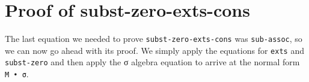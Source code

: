 \hypertarget{proof-of-subst-zero-exts-cons}{%
\section{Proof of
subst-zero-exts-cons}\label{proof-of-subst-zero-exts-cons}}

The last equation we needed to prove \texttt{subst-zero-exts-cons} was
\texttt{sub-assoc}, so we can now go ahead with its proof. We simply
apply the equations for \texttt{exts} and \texttt{subst-zero} and then
apply the σ algebra equation to arrive at the normal form
\texttt{M\ •\ σ}.

\begin{fence}
\begin{code}%
\>[0]%
\>[2388I]\AgdaSymbol{:}\AgdaSpace{}%
\AgdaSpace{}%
\AgdaSymbol{\}\{}\AgdaSpace{}%
\AgdaSymbol{:}\AgdaSpace{}%
\AgdaSpace{}%
\AgdaSpace{}%
\AgdaSymbol{\}\{}\AgdaSymbol{\}\{}\AgdaSpace{}%
\AgdaSymbol{:}\AgdaSpace{}%
\AgdaSpace{}%
\AgdaSpace{}%
\AgdaSymbol{\}\{}\AgdaSymbol{\}}\<%
\\
\>[.][@{}l@{}]\<[2388I]%
\>[21]\AgdaSpace{}%
\AgdaSpace{}%
\AgdaSpace{}%
\AgdaSpace{}%
\AgdaSpace{}%
\AgdaSpace{}%
\AgdaSpace{}%
\AgdaSymbol{(}\AgdaSpace{}%
\AgdaSpace{}%
\AgdaSymbol{)}\AgdaSpace{}%
\AgdaSymbol{\{}\AgdaSymbol{\}}\<%
\\
\>[0]\AgdaSpace{}%
\AgdaSymbol{\{}\AgdaSymbol{\}\{}\AgdaSymbol{\}\{}\AgdaSymbol{\}\{}\AgdaSymbol{\}\{}\AgdaSymbol{\}\{}\AgdaSymbol{\}}\AgdaSpace{}%
\AgdaSymbol{=}\<%
\\
\>[0][@{}l@{\AgdaIndent{0}}]%
\>[4]\<%
\\
\>[4][@{}l@{\AgdaIndent{0}}]%
\>[6]\AgdaSpace{}%
\AgdaSpace{}%
\AgdaSpace{}%
\AgdaSpace{}%
\<%
\\
%
\>[4]\AgdaSpace{}%
\AgdaSpace{}%
\AgdaSpace{}%

\end{code}
\end{fence}
